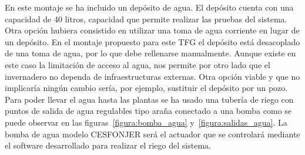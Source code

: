 \documentclass[a4paper, 12pt, oneside]{book}
\begin{document}
En este montaje se ha incluido un depósito de agua. El depósito cuenta con una capacidad de 40 litros, capacidad que permite realizar las pruebas del sistema.  
Otra opción hubiera consistido en utilizar una toma de agua corriente en lugar de un depósito. En el montaje propuesto para este TFG el depósito está desacoplado de una toma de agua, por lo que debe rellenarse manualmente.  Aunque existe en este caso la limitación de acceso al agua, nos permite por otro lado que el invernadero no dependa de infraestructuras externas. Otra opción viable y que no implicaría ningún cambio sería, por ejemplo, sustituir el depósito por un pozo. Para poder llevar el agua hasta las plantas se ha usado una tubería de riego con puntos de salida de agua regulables tipo araña conectado a una bomba como se puede observar en las figuras~\ref{figura:bomba_agua} y~\ref{figura:salidas_agua}. La bomba de agua modelo CESFONJER será el actuador que se controlará mediante el software desarrollado para realizar el riego del sistema.
\end{document}

